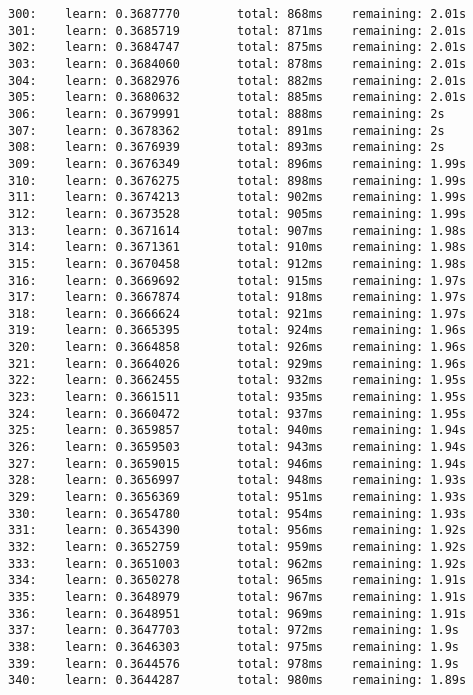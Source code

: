 \documentclass[11pt]{article}
\begin{document}
\begin{Verbatim}[commandchars=\\\{\}]
300:    learn: 0.3687770        total: 868ms    remaining: 2.01s
301:    learn: 0.3685719        total: 871ms    remaining: 2.01s
302:    learn: 0.3684747        total: 875ms    remaining: 2.01s
303:    learn: 0.3684060        total: 878ms    remaining: 2.01s
304:    learn: 0.3682976        total: 882ms    remaining: 2.01s
305:    learn: 0.3680632        total: 885ms    remaining: 2.01s
306:    learn: 0.3679991        total: 888ms    remaining: 2s
307:    learn: 0.3678362        total: 891ms    remaining: 2s
308:    learn: 0.3676939        total: 893ms    remaining: 2s
309:    learn: 0.3676349        total: 896ms    remaining: 1.99s
310:    learn: 0.3676275        total: 898ms    remaining: 1.99s
311:    learn: 0.3674213        total: 902ms    remaining: 1.99s
312:    learn: 0.3673528        total: 905ms    remaining: 1.99s
313:    learn: 0.3671614        total: 907ms    remaining: 1.98s
314:    learn: 0.3671361        total: 910ms    remaining: 1.98s
315:    learn: 0.3670458        total: 912ms    remaining: 1.98s
316:    learn: 0.3669692        total: 915ms    remaining: 1.97s
317:    learn: 0.3667874        total: 918ms    remaining: 1.97s
318:    learn: 0.3666624        total: 921ms    remaining: 1.97s
319:    learn: 0.3665395        total: 924ms    remaining: 1.96s
320:    learn: 0.3664858        total: 926ms    remaining: 1.96s
321:    learn: 0.3664026        total: 929ms    remaining: 1.96s
322:    learn: 0.3662455        total: 932ms    remaining: 1.95s
323:    learn: 0.3661511        total: 935ms    remaining: 1.95s
324:    learn: 0.3660472        total: 937ms    remaining: 1.95s
325:    learn: 0.3659857        total: 940ms    remaining: 1.94s
326:    learn: 0.3659503        total: 943ms    remaining: 1.94s
327:    learn: 0.3659015        total: 946ms    remaining: 1.94s
328:    learn: 0.3656997        total: 948ms    remaining: 1.93s
329:    learn: 0.3656369        total: 951ms    remaining: 1.93s
330:    learn: 0.3654780        total: 954ms    remaining: 1.93s
331:    learn: 0.3654390        total: 956ms    remaining: 1.92s
332:    learn: 0.3652759        total: 959ms    remaining: 1.92s
333:    learn: 0.3651003        total: 962ms    remaining: 1.92s
334:    learn: 0.3650278        total: 965ms    remaining: 1.91s
335:    learn: 0.3648979        total: 967ms    remaining: 1.91s
336:    learn: 0.3648951        total: 969ms    remaining: 1.91s
337:    learn: 0.3647703        total: 972ms    remaining: 1.9s
338:    learn: 0.3646303        total: 975ms    remaining: 1.9s
339:    learn: 0.3644576        total: 978ms    remaining: 1.9s
340:    learn: 0.3644287        total: 980ms    remaining: 1.89s

\end{Verbatim}
\end{document}

